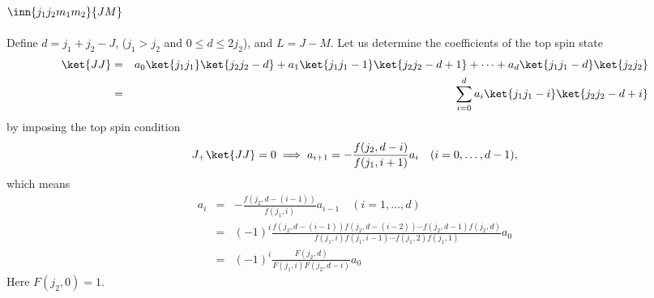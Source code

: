 \documentclass{article}
\begin{document}
\subsection{$\inn{j_1j_2m_1m_2}{JM}$}
\label{sec-4-1}
Define $d=j_1+j_2 -J$, ($j_1 > j_2$ and $0\le d \le 2j_2$), and $L = J-M$. Let us determine the coefficients of the top spin state
\begin{eqnarray}
\ket{JJ}  &=&  a_0\ket{j_1j_1}\ket{j_2j_2-d} + a_1\ket{j_1j_1-1}\ket{j_2j_2-d+1} + \cdots + a_d\ket{j_1j_1-d}\ket{j_2j_2} \nonumber\\
 & = & \sum_{i=0}^{d} a_i\ket{j_1j_1-i}\ket{j_2j_2-d+i}
\end{eqnarray}
by imposing the top spin condition
\begin{equation}
\label{ }
J_{+}\ket{JJ}  =  0 \implies a_{i+1}=-\frac{f(j_2,d-i)}{f(j_1,i+1)}a_i \quad (i=0,\ldots,d-1),
\end{equation}
which means
\begin{eqnarray}
 a_{i} & = & -\frac{f(j_2,d-(i-1))}{f(j_1,i)}a_{i-1} \quad (i=1,\ldots,d)\\
       & = & (-1)^i\frac{f(j_2,d-(i-1))f(j_2,d-(i-2)) \cdots f(j_2,d-1)f(j_2,d)}{f(j_1,i)f(j_1,i-1) \cdots f(j_1,2)f(j_1,1)}a_{0} \\
       & = & (-1)^i\frac{F(j_2,d)}{F(j_1,i)F(j_2,d-i)} a_{0} 
\end{eqnarray}
Here $F(j_2,0)=1$.
\end{document}
